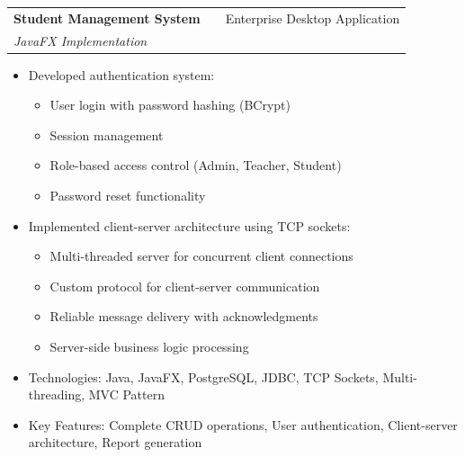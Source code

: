 \documentclass[a4paper,12pt]{article}
\makeatletter
\newenvironment{projectdetailed}[3]
    {
    \begin{tabularx}{\linewidth}{@{}l X r@{}}
    \textbf{#1} & \hfill & #2 \\
    \textit{#3} & & \\[3.75pt]
    \end{tabularx}
    \begin{minipage}[t]{\linewidth}
    \begin{itemize}[nosep,after=\strut, leftmargin=1em, itemsep=2pt,label=--]
    }
    {
    \end{itemize}
    \end{minipage}
    \vspace{6pt}
    }
\makeatother
\begin{document}
\begin{projectdetailed}{Student Management System}{Enterprise Desktop Application}{JavaFX Implementation}
\begin{itemize}[nosep, leftmargin=2em]
    \item Database connection pooling for performance
\end{itemize}
\item Developed authentication system:
\begin{itemize}[nosep, leftmargin=2em]
    \item User login with password hashing (BCrypt)
    \item Session management
    \item Role-based access control (Admin, Teacher, Student)
    \item Password reset functionality
\end{itemize}
\item Implemented client-server architecture using TCP sockets:
\begin{itemize}[nosep, leftmargin=2em]
    \item Multi-threaded server for concurrent client connections
    \item Custom protocol for client-server communication
    \item Reliable message delivery with acknowledgments
    \item Server-side business logic processing
\end{itemize}
\item Technologies: Java, JavaFX, PostgreSQL, JDBC, TCP Sockets, Multi-threading, MVC Pattern
\item Key Features: Complete CRUD operations, User authentication, Client-server architecture, Report generation
\end{projectdetailed}
\end{document}
